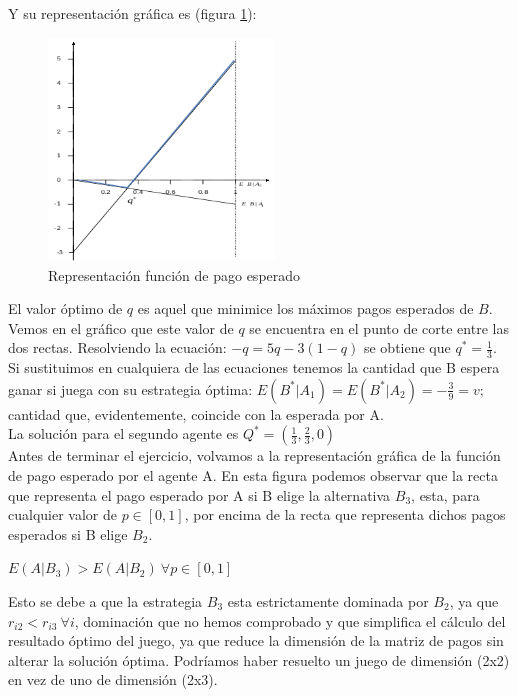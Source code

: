 \begin{enumerate}
Y su representación gráfica es (figura \ref{fig:func_pago2}):
\\
\begin{figure}[h]
     \begin{center}
         \includegraphics[width=60mm]{chapters/chapter5/figures/Picture2.png}
     \end{center}
     \caption{Representación función de pago esperado}
\label{fig:func_pago2}
\end{figure}
El valor óptimo de $q$ es aquel que minimice los máximos pagos esperados de $B$. Vemos en el gráfico que este valor de $q$ se encuentra en el punto de corte entre las dos rectas. Resolviendo la ecuación: $-q=5q-3(1-q)$ se obtiene que $q^*=\frac{1}{3}$.\\
\vspace{2mm}
Si sustituimos en cualquiera de las ecuaciones  tenemos la cantidad que B espera ganar si juega con su estrategia óptima: $E(B^*|A_1)=E(B^*|A_2)=-\frac{3}{9}=v$; cantidad que, evidentemente, coincide con la esperada por  A.
\\
\vspace{2mm}
La solución para el segundo agente es $Q^*=(\frac{1}{3},\frac{2}{3},0)$
\\
\vspace{2mm}
Antes de terminar el ejercicio, volvamos a la representación gráfica de la función de pago esperado por el agente A. En esta figura podemos observar que la recta que representa el pago esperado por A si B elige la alternativa $B_3$, esta, para cualquier valor de $p \in [0,1]$, por encima de la recta que representa dichos pagos esperados si B elige $B_2$.
\\
\begin{center}
    $E(A|B_3)>E(A|B_2) \: \forall p \in [0,1]$\\
\end{center}
Esto se debe a que la estrategia $B_3$ esta estrictamente dominada por $B_2$, ya que $r_{i2}<r_{i3} \: \forall i$,  dominación que no hemos comprobado y que simplifica el cálculo del resultado óptimo del juego, ya que reduce la dimensión de la matriz de pagos sin alterar la solución óptima. Podríamos haber resuelto un juego de dimensión (2x2) en vez de uno de dimensión (2x3).

\end{enumerate}
